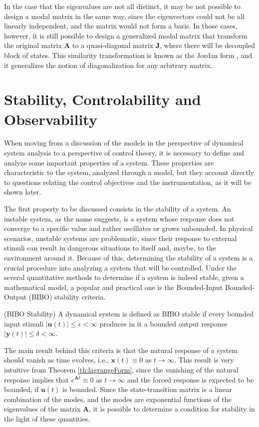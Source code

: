 \documentclass[a4paper,11pt]{book}
\numberwithin{figure}{chapter}
\numberwithin{equation}{chapter}
\numberwithin{table}{chapter}
\theoremstyle{definition}
\newtheorem{definition}{Definition}[chapter]
\newcounter{boxed-theorem}
\newcounter{boxed-definition}
\newenvironment{boxed-definition}[1]
{\begin{shaded} \begin{definition}{#1}}
{\end{definition} \end{shaded}}
\begin{document}
In the case that the eigenvalues are not all distinct, it may be not possible to design a modal matrix in the same way, since the eigenvectors could not be all linearly independent, and the matrix would not form a basis. In those cases, however, it is still possible to design a generalized modal matrix that transform the original matrix $\bm{A}$ to a quasi-diagonal matrix $\bm{J}$, where there will be decoupled block of states. This similarity transformation is known as the Jordan form \cite{Strang:2016}, and it generalizes the notion of diagonalization for any arbitrary matrix.

\section{Stability, Controlability and Observability}

When moving from a discussion of the models in the perspective of dynamical system analysis to a perspective of control theory, it is necessary to define and analyze some important properties of a system. These properties are characteristic to the system, analyzed through a model, but they account directly to questions relating the control objectives and the instrumentation, as it will be shown later.

The first property to be discussed consists in the stability of a system. An instable system, as the name suggests, is a system whose response does not converge to a specific value and rather oscillates or grows unbounded. In physical scenarios, unstable systems are problematic, since their response to external stimuli can result in dangerous situations to itself and, maybe, to the environment around it. Because of this, determining the stability of a system is a crucial procedure into analyzing a system that will be controlled. Under the several quantitative methods to determine if a system is indeed stable, given a mathematical model, a popular and practical one is the Bounded-Input Bounded-Output (BIBO) stability criteria.

\begin{boxed-definition}{(BIBO Stability)} \label{def:BIBOStab}
	A dynamical system is defined as BIBO stable if every bounded input stimuli $| \bm{u}(t) | \leq \epsilon < \infty$ produces in it a bounded output response $| \bm{y}(t) | \leq \delta < \infty$.
\end{boxed-definition}

The main result behind this criteria is that the natural response of a system should vanish as time evolves, i.e., $\bm{x}(t) \equiv 0$ as $t \to \infty$. This result is very intuitive from Theorem \ref{th:lagrangeForm}, since the vanishing of the natural response implies that $e^{\bm{A} t} \equiv 0$ as $t \to \infty$ and the forced response is expected to be bounded, if $\bm{u}(t)$ is bounded. Since the state-transition matrix is a linear combination of the modes, and the modes are exponential functions of the eigenvalues of the matrix $\bm{A}$, it is possible to determine a condition for stability in the light of these quantities.
\end{document}
